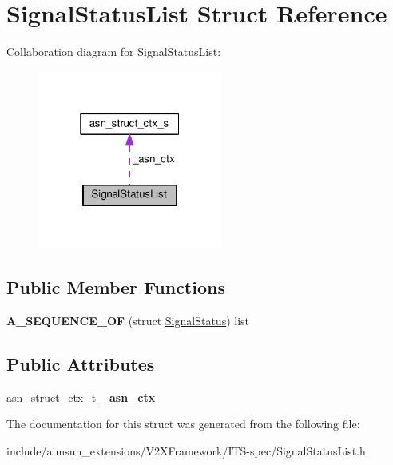 \hypertarget{structSignalStatusList}{}\section{Signal\+Status\+List Struct Reference}
\label{structSignalStatusList}


Collaboration diagram for Signal\+Status\+List\+:\nopagebreak
\begin{figure}[H]
\begin{center}
\leavevmode
\includegraphics[width=172pt]{structSignalStatusList__coll__graph}
\end{center}
\end{figure}
\subsection*{Public Member Functions}
\begin{DoxyCompactItemize}
\item 
{\bfseries A\+\_\+\+S\+E\+Q\+U\+E\+N\+C\+E\+\_\+\+OF} (struct \hyperlink{structSignalStatus}{Signal\+Status}) list\hypertarget{structSignalStatusList_afb6efda5d7900eb3c3ac7f5cf5fa489f}{}\label{structSignalStatusList_afb6efda5d7900eb3c3ac7f5cf5fa489f}

\end{DoxyCompactItemize}
\subsection*{Public Attributes}
\begin{DoxyCompactItemize}
\item 
\hyperlink{structasn__struct__ctx__s}{asn\+\_\+struct\+\_\+ctx\+\_\+t} {\bfseries \+\_\+asn\+\_\+ctx}\hypertarget{structSignalStatusList_ae6e03f0ba456efb32a68f99a30d9ff9e}{}\label{structSignalStatusList_ae6e03f0ba456efb32a68f99a30d9ff9e}

\end{DoxyCompactItemize}


The documentation for this struct was generated from the following file\+:\begin{DoxyCompactItemize}
\item 
include/aimsun\+\_\+extensions/\+V2\+X\+Framework/\+I\+T\+S-\/spec/Signal\+Status\+List.\+h\end{DoxyCompactItemize}

